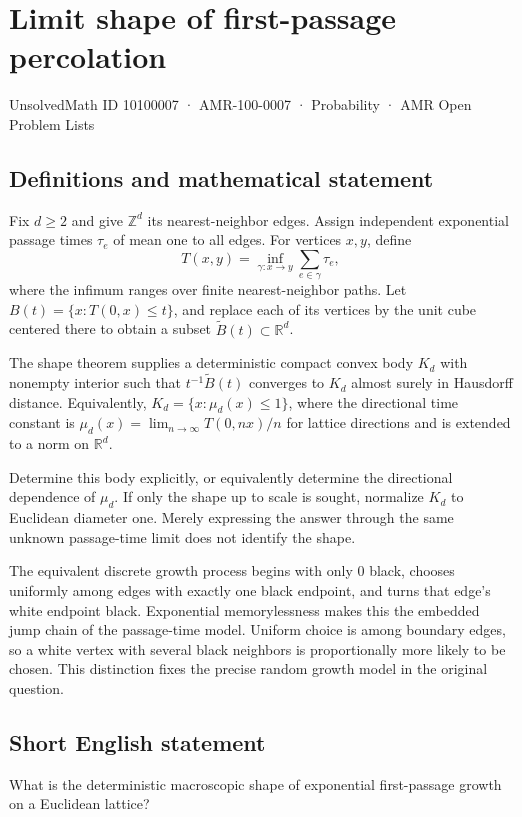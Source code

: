 \documentclass[11pt,a4paper]{article}
\begin{document}
\section*{Limit shape of first-passage percolation}\label{10100007}
{\small UnsolvedMath ID 10100007 · AMR-100-0007 · Probability · AMR Open Problem Lists}
\subsection{Definitions and mathematical statement}
Fix $d\ge2$ and give $\mathbb Z^d$ its nearest-neighbor edges. Assign independent exponential passage times $\tau_e$ of mean one to all edges. For vertices $x,y$, define
\[
T(x,y)=\inf_{\gamma:x\to y}\sum_{e\in\gamma}\tau_e,
\]
where the infimum ranges over finite nearest-neighbor paths. Let $B(t)=\{x:T(0,x)\le t\}$, and replace each of its vertices by the unit cube centered there to obtain a subset $\widetilde B(t)\subset\mathbb R^d$.

The shape theorem supplies a deterministic compact convex body $K_d$ with nonempty interior such that $t^{-1}\widetilde B(t)$ converges to $K_d$ almost surely in Hausdorff distance. Equivalently, $K_d=\{x:\mu_d(x)\le1\}$, where the directional time constant is $\mu_d(x)=\lim_{n\to\infty}T(0,nx)/n$ for lattice directions and is extended to a norm on $\mathbb R^d$.

Determine this body explicitly, or equivalently determine the directional dependence of $\mu_d$. If only the shape up to scale is sought, normalize $K_d$ to Euclidean diameter one. Merely expressing the answer through the same unknown passage-time limit does not identify the shape.

The equivalent discrete growth process begins with only $0$ black, chooses uniformly among edges with exactly one black endpoint, and turns that edge's white endpoint black. Exponential memorylessness makes this the embedded jump chain of the passage-time model. Uniform choice is among boundary edges, so a white vertex with several black neighbors is proportionally more likely to be chosen. This distinction fixes the precise random growth model in the original question.
\subsection{Short English statement}
What is the deterministic macroscopic shape of exponential first-passage growth on a Euclidean lattice?
\end{document}
